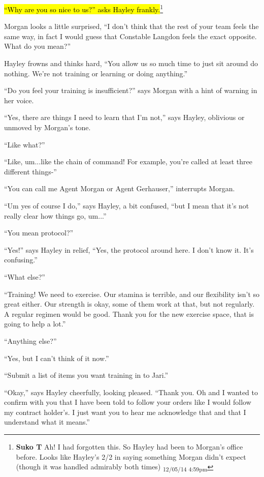 \hl{``Why are you so nice to us?'' asks Hayley frankly.}\footnote{\textbf{Suko T }Ah!  I had forgotten this.  So Hayley  had been to Morgan's office before. Looks like Hayley's 2/2 in saying something Morgan didn't expect (though it was handled admirably both times) \textsubscript{12/05/14 4:59pm}}

Morgan looks a little surprised, ``I don't think that the rest of your team feels the same way, in fact I would guess that Constable Langdon feels the exact opposite.  What do you mean?''

Hayley frowns and thinks hard, ``You allow us so much time to just sit around do nothing.  We're not training or learning or doing anything.''

``Do you feel your training is insufficient?'' says Morgan with a hint of warning in her voice.

``Yes, there are things I need to learn that I'm not,'' says Hayley, oblivious or unmoved by Morgan's tone.

``Like what?''

``Like, um...like the chain of command!  For example, you're called at least three different things-''

``You can call me Agent Morgan or Agent Gerhauser,'' interrupts Morgan.

``Um yes of course I do,'' says Hayley, a bit confused, ``but I mean that it's not really clear how things go, um...''

``You mean protocol?''

``Yes!'' says Hayley in relief, ``Yes, the protocol around here.  I don't know it.  It's confusing.''

``What else?''

``Training!  We need to exercise.  Our stamina is terrible, and our flexibility isn't so great either.  Our strength is okay, some of them work at that, but not regularly.  A regular regimen would be good.  Thank you for the new exercise space, that is going to help a lot.''

``Anything else?''

``Yes, but I can't think of it now.''

``Submit a list of items you want training in to Jari.''

``Okay,'' says Hayley cheerfully, looking pleased. ``Thank you.  Oh and I wanted to confirm with you that I have been told to follow your orders like I would follow my contract holder's.  I just want you to hear me acknowledge that and that I understand what it means.''


